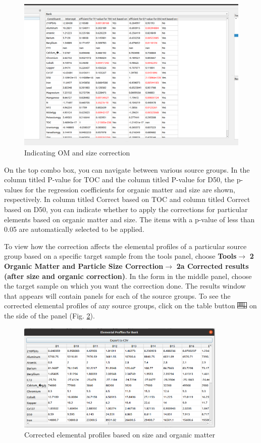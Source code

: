 \documentclass[12pt]{report}
\begin{document}
\begin{figure}[ht]
    \centering
    \includegraphics[width=12cm]{Figures/IndicateOMandSizeCorrection.png}
    \caption{Indicating OM and size correction}
    \label{fig:indicate_om_and_size_correction}
\end{figure}
\FloatBarrier
On the top combo box, you can navigate between various source groups. In the column titled P-value for TOC and the column titled P-value for D50, the p-values for the regression coefficients for organic matter and size are shown, respectively.  In column titled Correct based on TOC and column titled Correct based on D50, you can indicate whether to apply the corrections for particular elements based on organic matter and size. The items with a p-value of less than 0.05 are automatically selected to be applied.  

To view how the correction affects the elemental profiles of a particular source group based on a specific target sample from the tools panel, choose \textbf{Tools}$\rightarrow$\textbf{ 2 Organic Matter and Particle Size Correction}$\rightarrow$\textbf{ 2a Corrected results (after size and organic correction)}. In the form in the middle panel, choose the target sample on which you want the correction done. The results window that appears will contain panels for each of the source groups. To see the corrected elemental profiles of any source groups, click on the table button \includegraphics[width=0.5cm]{Figures/table.png} on the side of the panel (Fig. \ref{fig:corrected_elements_table}). 

\begin{figure}[ht]
    \centering
    \includegraphics[width=10cm]{Figures/CorrectedEPsTable.png}
    \caption{Corrected elemental profiles based on size and organic matter}
    \label{fig:corrected_elements_table}
\end{figure}
\end{document}
